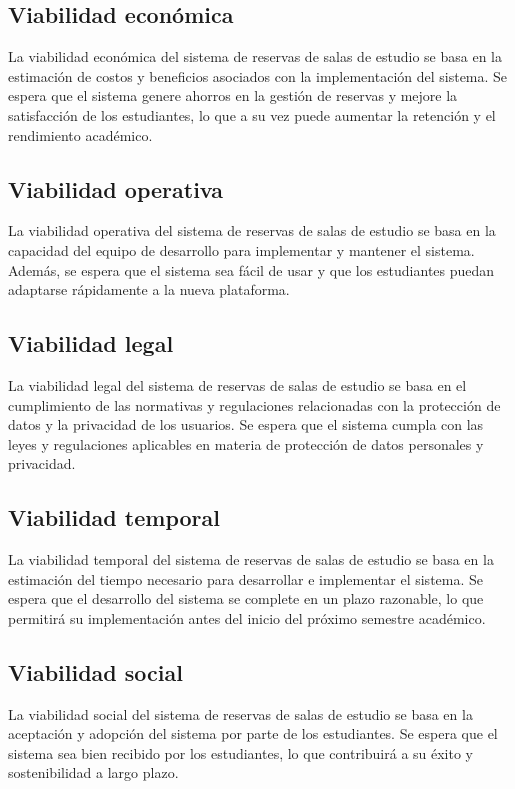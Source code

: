 \documentclass{article}
\begin{document}
      \subsection{Viabilidad económica}
      La viabilidad económica del sistema de reservas de salas de estudio se basa en la estimación de costos y beneficios asociados con la implementación del sistema. Se espera que el sistema genere ahorros en la gestión de reservas y mejore la satisfacción de los estudiantes, lo que a su vez puede aumentar la retención y el rendimiento académico.
      \subsection{Viabilidad operativa}
      La viabilidad operativa del sistema de reservas de salas de estudio se basa en la capacidad del equipo de desarrollo para implementar y mantener el sistema. Además, se espera que el sistema sea fácil de usar y que los estudiantes puedan adaptarse rápidamente a la nueva plataforma.
      \subsection{Viabilidad legal}
      La viabilidad legal del sistema de reservas de salas de estudio se basa en el cumplimiento de las normativas y regulaciones relacionadas con la protección de datos y la privacidad de los usuarios. Se espera que el sistema cumpla con las leyes y regulaciones aplicables en materia de protección de datos personales y privacidad.
      \subsection{Viabilidad temporal}
      La viabilidad temporal del sistema de reservas de salas de estudio se basa en la estimación del tiempo necesario para desarrollar e implementar el sistema. Se espera que el desarrollo del sistema se complete en un plazo razonable, lo que permitirá su implementación antes del inicio del próximo semestre académico.
      \subsection{Viabilidad social}
      La viabilidad social del sistema de reservas de salas de estudio se basa en la aceptación y adopción del sistema por parte de los estudiantes. Se espera que el sistema sea bien recibido por los estudiantes, lo que contribuirá a su éxito y sostenibilidad a largo plazo.
\end{document}
